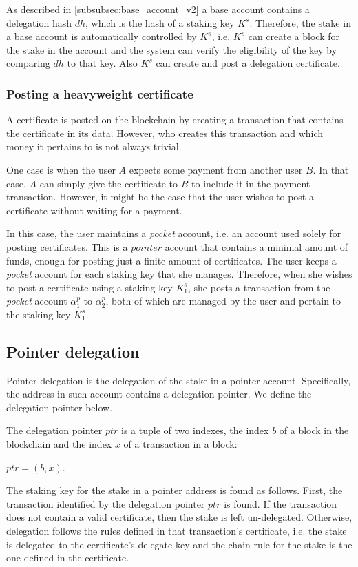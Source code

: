 As described in \ref{subsubsec:base_account_v2} a base account contains a delegation hash $dh$, which is the hash of a staking key $K^s$. Therefore, the stake in a base account is automatically controlled by $K^s$, i.e. $K^s$ can create a block for the stake in the account and the system can verify the eligibility of the key by comparing $dh$ to that key. Also $K^s$ can create and post a delegation certificate.

\subsubsection{Posting a heavyweight certificate}

A certificate is posted on the blockchain by creating a transaction that contains the certificate in its data. However, who creates this transaction and which money it pertains to is not always trivial.

One case is when the user $A$ expects some payment from another user $B$. In that case, $A$ can simply give the certificate to $B$ to include it in the payment transaction. However, it might be the case that the user wishes to post a certificate without waiting for a payment.

In this case, the user maintains a \textit{pocket} account, i.e. an account used solely for posting certificates. This is a $pointer$ account that contains a minimal amount of funds, enough for posting just a finite amount of certificates. The user keeps a \textit{pocket} account for each staking key that she manages. Therefore, when she wishes to post a certificate using a staking key $K^s_1$, she posts a transaction from the \textit{pocket} account ${\alpha}^p_1$ to ${\alpha}^p_2$, both of which are managed by the user and pertain to the staking key $K^s_1$.

\subsection{Pointer delegation}

Pointer delegation is the delegation of the stake in a pointer account. Specifically, the address in such account contains a delegation pointer. We define the delegation pointer below.

\begin{defn}\label{def:delegation_pointer}
The delegation pointer $ptr$ is a tuple of two indexes, the index $b$ of a block in the blockchain and the index $x$ of a transaction in a block:

$ptr = (b, x)$.
\end{defn}

The staking key for the stake in a pointer address is found as follows. First, the transaction identified by the delegation pointer $ptr$ is found. If the transaction does not contain a valid certificate, then the stake is left un-delegated. Otherwise, delegation follows the rules defined in that transaction's certificate, i.e. the stake is delegated to the certificate's delegate key and the chain rule for the stake is the one defined in the certificate.